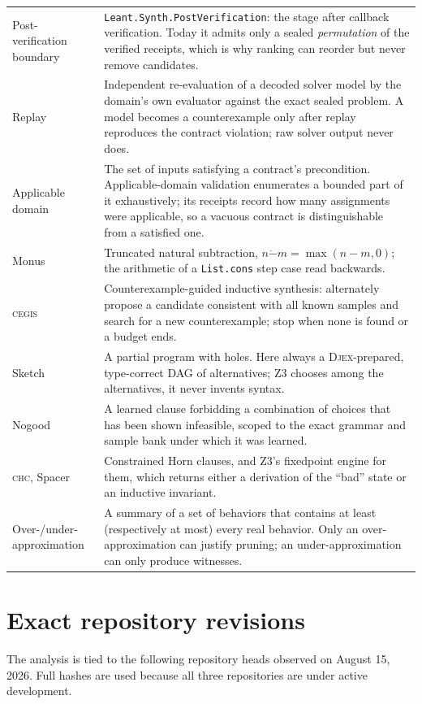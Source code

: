 \documentclass[11pt,oneside]{report}
\newcommand{\Djex}{\textsc{Djex}\xspace}
\newcommand{\Zthree}{\textsc{Z3}\xspace}
\newcommand{\CEGIS}{\textsc{cegis}\xspace}
\newcommand{\CHC}{\textsc{chc}\xspace}
\newcommand{\code}[1]{\texttt{#1}}
\begin{document}
\begin{longtable}{@{}L{0.21\textwidth}L{0.73\textwidth}@{}}
Post-verification boundary & \code{Leant.Synth.PostVerification}: the stage after callback verification. Today it admits only a sealed \emph{permutation} of the verified receipts, which is why ranking can reorder but never remove candidates. \\
Replay & Independent re-evaluation of a decoded solver model by the domain's own evaluator against the exact sealed problem. A model becomes a counterexample only after replay reproduces the contract violation; raw solver output never does. \\
Applicable domain & The set of inputs satisfying a contract's precondition. Applicable-domain validation enumerates a bounded part of it exhaustively; its receipts record how many assignments were applicable, so a vacuous contract is distinguishable from a satisfied one. \\
Monus & Truncated natural subtraction, $n \mathbin{\dot{-}} m = \max(n-m,0)$; the arithmetic of a \code{List.cons} step case read backwards. \\
\CEGIS & Counterexample-guided inductive synthesis: alternately propose a candidate consistent with all known samples and search for a new counterexample; stop when none is found or a budget ends. \\
Sketch & A partial program with holes. Here always a \Djex-prepared, type-correct DAG of alternatives; \Zthree chooses among the alternatives, it never invents syntax. \\
Nogood & A learned clause forbidding a combination of choices that has been shown infeasible, scoped to the exact grammar and sample bank under which it was learned. \\
\CHC, Spacer & Constrained Horn clauses, and \Zthree's fixedpoint engine for them, which returns either a derivation of the ``bad'' state or an inductive invariant. \\
Over-/under-approximation & A summary of a set of behaviors that contains at least (respectively at most) every real behavior. Only an over-approximation can justify pruning; an under-approximation can only produce witnesses. \\
\end{longtable}

\section{Exact repository revisions}
\label{sec:revisions}

The analysis is tied to the following repository heads observed on August 15, 2026. Full hashes are used because all three repositories are under active development.
\end{document}

